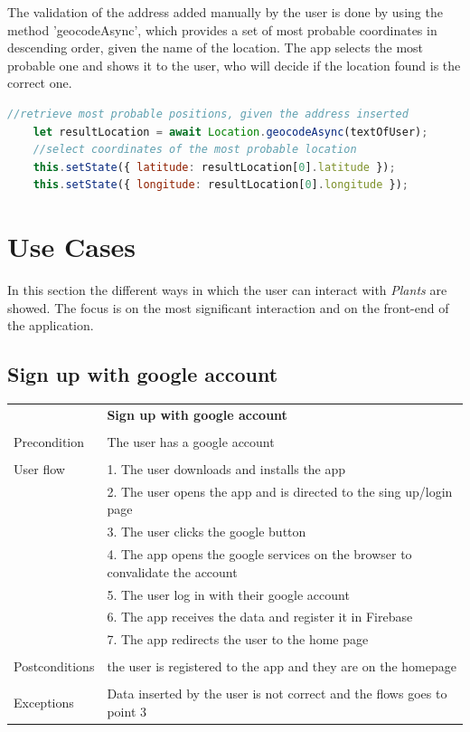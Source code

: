 \documentclass[10pt]{article}
\begin{document}
	The validation of the address added manually by the user is done by using the method 'geocodeAsync', which provides a set of most probable coordinates in descending order, given the name of the location. The app selects the most probable one and shows it to the user, who will decide if the location found is the correct one.
	\begin{lstlisting}[language=JavaScript]
    //retrieve most probable positions, given the address inserted
    let resultLocation = await Location.geocodeAsync(textOfUser);
    //select coordinates of the most probable location
    this.setState({ latitude: resultLocation[0].latitude });
    this.setState({ longitude: resultLocation[0].longitude });
    \end{lstlisting}
	
	\newpage
	\section{Use Cases}
	In this section the different ways in which the user can interact with \textit{Plants} are showed. The focus is on the most significant interaction and on the front-end of the application.
    
    \subsection{Sign up with google account}
    \begin{tabular}{ p{3cm}|p{8cm} }
     &\textbf{Sign up with google account} \\
     \\
     Precondition & The user has a google account \\
     \\
     User flow 
     & 1. The user downloads and installs the app\\ 
     & 2. The user opens the app and is directed to the sing up/login page \\
     & 3. The user clicks the google button\\ 
     & 4. The app opens the google services on the browser to convalidate the account  \\
     & 5. The user log in with their google account\\
     & 6. The app receives the data and register it in Firebase\\
     & 7. The app redirects the user to the home page\\
     \\
     Postconditions & the user is registered to the app and they are on the homepage \\ 
     \\
     Exceptions & Data inserted by the user is not correct and the flows goes to point 3\\
    \end{tabular}
    \newline
    \newline
    \newline
\end{document}
